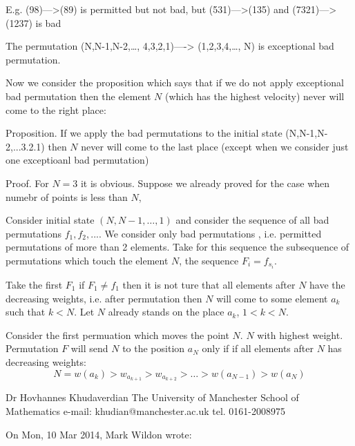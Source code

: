E.g. (98)--->(89) is permitted but not bad, but
     (531)--->(135) and (7321)--->(1237) is bad

The permutation (N,N-1,N-2,\dots, 4,3,2,1)----> (1,2,3,4,\dots, N)
is exceptional bad permutation.

Now we consider the proposition which says that
if we do not apply  exceptional bad permutation then the element
$N$ (which has the highest velocity) never will come to the
right place:

Proposition. If we apply the bad permutations to the
  initial state (N,N-1,N-2,...3.2.1) then $N$ never will come to the last
place (except when we consider just one exceptioanl bad permutation)



Proof. For $N=3$ it is obvious. Suppose we already proved
for the case when numebr of points is less than $N$,

Consider initial state $(N,N-1,\dots, 1)$
and consider the sequence of all bad permutations
$f_1,f_2,....$
We consider only bad permutations , i.e. permitted permutations of more 
than 2 elements.
Take for this sequence the subsequence of permutations which touch the 
element $N$, the sequence
   $F_i=f_{s_i}$.

Take the first $F_1$ if $F_1\not=f_1$
then it is not ture that all elements after $N$ have the decreasing 
weights, i.e. after permutation
then $N$ will come to some element
$a_k$ such that $k<N$.
Let  $N$ already stands on the place $a_k$, $1<k<N$.

Consider the first permuation which moves the point $N$.
$N$ with  highest weight. Permutation $F$ will send $N$ to the position
$a_N$ only if if all elements after $N$ has decreasing weights:
         $$
N=w(a_k)> w_{a_{k+1}}> w_{a_{k+2}}>\dots> w(a_{N-1})>w(a_N)
         $$




                                     Dr Hovhannes Khudaverdian
                                    The University of Manchester
                                       School of Mathematics
                                   e-mail: khudian@manchester.ac.uk
                                        tel. 0161-2008975



On Mon, 10 Mar 2014, Mark Wildon wrote:


